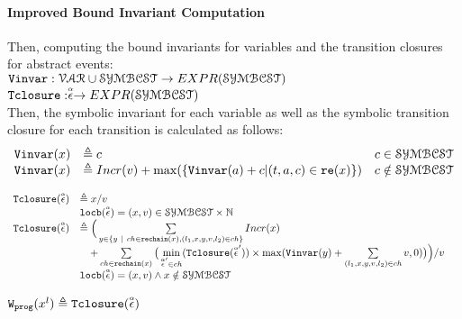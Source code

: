 \paragraph*{Improved Bound Invariant Computation}
Then, computing the bound invariants for variables and the transition closures for abstract events:
\\ 
$ {\mathtt{Vinvar}}: \mathcal{VAR} \cup \mathcal{SYMBCST} \to EXPR(\mathcal{SYMBCST})$
\\
${\mathtt{Tclosure}}: \stackrel{\scriptscriptstyle{\alpha}}{\mathtt{\epsilon}{}} \to EXPR(\mathcal{SYMBCST})$
\\
Then, the symbolic invariant for each variable 
as well as the symbolic transition closure for each transition is calculated as follows:
\[ 
\begin{array}{lll}
  {\ensuremath{\mathtt{Vinvar}}}(x) & \triangleq c & c \in \mathcal{SYMBCST} \\
  {\mathtt{Vinvar}}(x) & \triangleq Incr(v) + \max(\{{\mathtt{Vinvar}}(a) + c | (t, a, c) \in \mathtt{re}(x)\}) & c \notin \mathcal{SYMBCST}
\end{array}
\]
%
\begin{defn}
  \label{def:transition_closure}
\[ 
\begin{array}{lll}
  {\ensuremath{\mathtt{Tclosure}}}(\stackrel{\scriptscriptstyle{\alpha}}{\mathtt{\epsilon}{}}) 
  & \triangleq x / v & \\ 
  & \mathtt{locb}(\stackrel{\scriptscriptstyle{\alpha}}{\mathtt{\epsilon}{}}) = (x, v) \in \mathcal{SYMBCST} \times \mathbb{N} & \\
  {\mathtt{Tclosure}}(\stackrel{\scriptscriptstyle{\alpha}}{\mathtt{\epsilon}{}}) 
  & \triangleq \Big(
    \sum\limits_{y \in \{ y ~|~ 
    ch \in \mathtt{rechain}(x), (l_1, x, y, v, l_2) \in ch \} } Incr(x) & \\
    & \quad + 
  \sum\limits_{ch \in \mathtt{rechain}(x)}
  \big( \min\limits_{\stackrel{\scriptscriptstyle{\alpha}}{\mathtt{\epsilon}{}}' \in ch}({{\mathtt{Tclosure}}(\stackrel{\scriptscriptstyle{\alpha}}{\mathtt{\epsilon}{}}')}) \times 
  \max({\mathtt{Vinvar}}(y) + \sum\limits_{(l_1, x, y, v, l_2) \in ch } v, 0)\big) \Big) / v & \\
  & \mathtt{locb}(\stackrel{\scriptscriptstyle{\alpha}}{\mathtt{\epsilon}{}}) = (x, v) \land x \notin \mathcal{SYMBCST} & 
\end{array}
  \]
\end{defn}
$
\mathtt{{W_{prog}}}(x^l) 
  \triangleq {\ensuremath{\mathtt{Tclosure}}}(\stackrel{\scriptscriptstyle{\alpha}}{\mathtt{\epsilon}{}})
$
